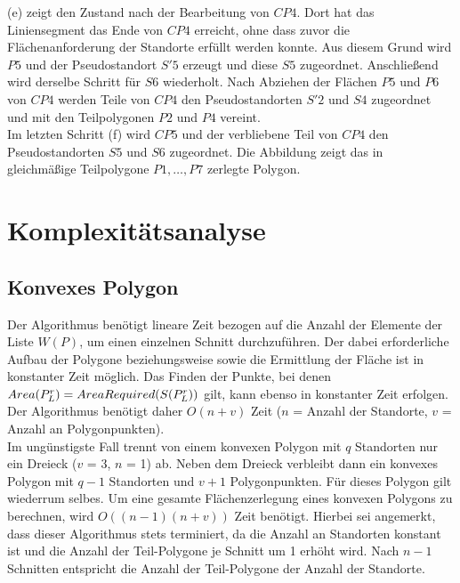 \documentclass[ngerman]{seminarbeitrag}
\begin{document}
 (e) zeigt den Zustand nach der Bearbeitung von $CP4$. Dort hat das Liniensegment das Ende von $CP4$ erreicht, ohne dass zuvor die Flächenanforderung der Standorte erfüllt werden konnte. Aus diesem Grund wird $P5$ und der Pseudostandort $S'5$ erzeugt und diese $S5$ zugeordnet. Anschließend wird derselbe Schritt für $S6$ wiederholt. Nach Abziehen der Flächen $P5$ und $P6$ von $CP4$ werden Teile von $CP4$ den Pseudostandorten $S'2$ und $S4$ zugeordnet und mit den Teilpolygonen $P2$ und $P4$ vereint.\\
Im letzten Schritt (f) wird $CP5$ und der verbliebene Teil von $CP4$ den Pseudostandorten $S5$ und $S6$ zugeordnet. Die Abbildung zeigt das in gleichmäßige Teilpolygone $P1,…,P7$ zerlegte Polygon.

\section{Komplexitätsanalyse}\label{komplex}
\subsection{Konvexes Polygon}
Der Algorithmus \con benötigt lineare Zeit bezogen auf die Anzahl der Elemente der Liste $W(P)$, um einen einzelnen Schnitt durchzuführen. Der dabei erforderliche Aufbau der Polygone \prl beziehungsweise \pll sowie die Ermittlung der Fläche ist in konstanter Zeit möglich. Das Finden der Punkte, bei denen $Area(P_{L}^{r}) = AreaRequired(S(P_{L}^{r}))$ gilt, kann ebenso in konstanter Zeit erfolgen. Der Algorithmus \con benötigt daher $O(n+v)$ Zeit ($n$ = Anzahl der Standorte, $v$ = Anzahl an Polygonpunkten).\\
Im ungünstigste Fall trennt \con von einem konvexen Polygon mit $q$ Standorten nur ein Dreieck ($v$ = 3, $n$ = 1) ab. Neben dem Dreieck verbleibt dann ein konvexes Polygon mit $q-1$ Standorten und $v+1$ Polygonpunkten. Für dieses Polygon gilt wiederrum selbes. Um eine gesamte Flächenzerlegung eines konvexen Polygons zu berechnen, wird $O((n-1)(n+v))$ Zeit benötigt. 
Hierbei sei angemerkt, dass dieser Algorithmus stets terminiert, da die Anzahl an Standorten konstant ist und die Anzahl der Teil-Polygone je Schnitt um 1 erhöht wird. Nach $n-1$ Schnitten entspricht die Anzahl der Teil-Polygone der Anzahl der Standorte.
\end{document}

